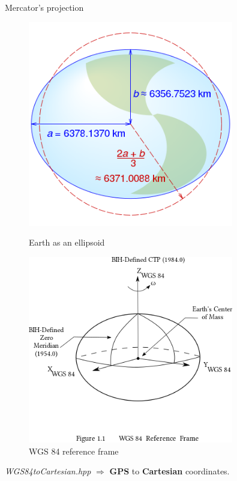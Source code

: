 \documentclass[10pt]{beamer}
\begin{document}
\begin{frame}{Mercator's projection}
  \Large
  \begin{figure}[H]
    \centering
    \begin{minipage}{0.49\textwidth}
        \centering
        \includegraphics[width=0.8\textwidth]{images/WGS84_mean_Earth_radius.svg.png}
        \caption{Earth as an ellipsoid}
    \end{minipage}\hfill
    \begin{minipage}{0.49\textwidth}
        \centering
        \includegraphics[width=0.8\textwidth]{images/WGS_84_reference_frame.png}
        \caption{WGS 84 reference frame}
    \end{minipage}
\end{figure}

\textit{WGS84toCartesian.hpp} $\Longrightarrow$ \textbf{GPS} to \textbf{Cartesian} coordinates.
\end{frame}
\end{document}
